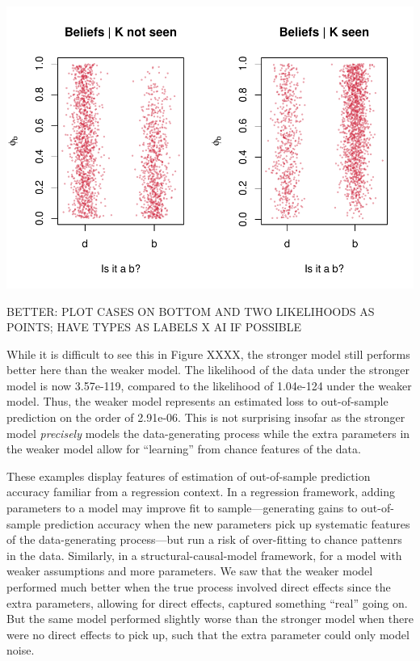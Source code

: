 \documentclass[
  12pt,
]{book}
\begin{document}
\includegraphics{ii_files/figure-latex/unnamed-chunk-26-1.pdf}

BETTER: PLOT CASES ON BOTTOM AND TWO LIKELIHOODS AS POINTS; HAVE TYPES AS LABELS X AI IF POSSIBLE

While it is difficult to see this in Figure XXXX, the stronger model still performs better here than the weaker model. The likelihood of the data under the stronger model is now 3.57e-119, compared to
the likelihood of 1.04e-124 under the weaker model. Thus, the weaker model represents an estimated loss to out-of-sample prediction on the order of 2.91e-06. This is not surprising insofar as the stronger model \emph{precisely} models the data-generating process while the extra parameters in the weaker model allow for ``learning'' from chance features of the data.

These examples display features of estimation of out-of-sample prediction accuracy familiar from a regression context. In a regression framework, adding parameters to a model may improve fit to sample---generating gains to out-of-sample prediction accuracy when the new parameters pick up systematic features of the data-generating process---but run a risk of over-fitting to chance pattenrs in the data. Similarly, in a structural-causal-model framework, for a model with weaker assumptions and more parameters. We saw that the weaker model performed much better when the true process involved direct effects since the extra parameters, allowing for direct effects, captured something ``real'' going on. But the same model performed slightly worse than the stronger model when there were no direct effects to pick up, such that the extra parameter could only model noise.
\end{document}
